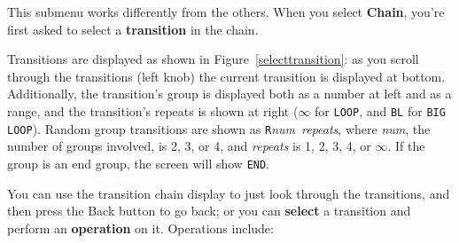 \documentclass{article}
\begin{document}
This submenu works differently from the others.  When you select {\bf Chain}, you're first asked to select a {\bf transition} in the chain.  

Transitions are displayed as shown in Figure~\ref{selecttransition}: as you scroll through the transitions (left knob) the current transition is displayed at bottom.  Additionally, the transition's group is displayed both as a number at left and as a range, and the transition's repeats is shown at right (\(\infty\) for \texttt{LOOP}, and {\tt BL} for \texttt{BIG LOOP}).  Random group transitions are shown as {\tt R}{\it num}~{\it repeats}, where {\it num}, the number of groups involved, is 2, 3, or 4, and {\it repeats} is 1, 2, 3, 4, or \(\infty\). If the group is an end group, the screen will show {\tt END}. 

You can use the transition chain display to just look through the transitions, and then press the Back button to go back; or you can {\bf select} a transition and perform an {\bf operation} on it.  Operations include:
\end{document}
